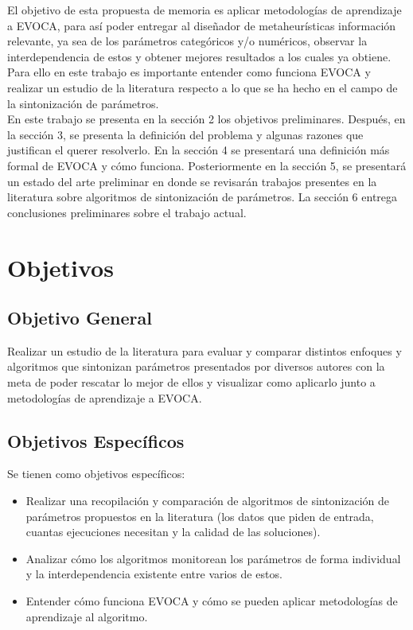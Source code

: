 \documentclass[letter, 10pt]{article}
\begin{document}
\begin{multicols}{2}
El objetivo de esta propuesta de memoria es aplicar metodologías de aprendizaje a EVOCA, para así poder entregar al diseñador de metaheurísticas información relevante, ya sea de los parámetros categóricos y/o numéricos, observar la interdependencia de estos y obtener mejores resultados a los cuales ya obtiene.
Para ello en este trabajo es  importante entender como funciona EVOCA y realizar un estudio de la literatura respecto a lo que se ha hecho en el campo de la sintonización de parámetros.\\

En este trabajo se presenta en la sección 2 los objetivos preliminares. Después, en la sección 3, se presenta la definición del problema y algunas razones que justifican el querer resolverlo. En la sección 4 se presentará una definición más formal de EVOCA y cómo funciona. Posteriormente en la sección 5, se presentará un estado del arte preliminar en donde se revisarán trabajos presentes en la literatura sobre algoritmos de sintonización de parámetros. La sección 6 entrega conclusiones preliminares sobre el trabajo actual.


\section{Objetivos}

\subsection{Objetivo General}
Realizar un estudio de la literatura para evaluar y comparar distintos enfoques y algoritmos que sintonizan parámetros presentados por diversos autores con la meta de poder rescatar lo mejor de ellos y visualizar como aplicarlo junto a metodologías de aprendizaje a EVOCA.


\subsection{Objetivos Específicos}
Se tienen como objetivos específicos:
\begin{itemize}
    \item Realizar una recopilación y comparación de algoritmos de sintonización de parámetros propuestos en 	la literatura (los datos que piden de entrada, cuantas ejecuciones necesitan y la calidad de las soluciones).
    \item Analizar cómo los algoritmos monitorean los parámetros de forma individual y la interdependencia existente entre varios de estos.
    \item Entender cómo funciona EVOCA y cómo se pueden aplicar metodologías de aprendizaje al algoritmo.
\end{itemize}	


\end{multicols}
\end{document}

